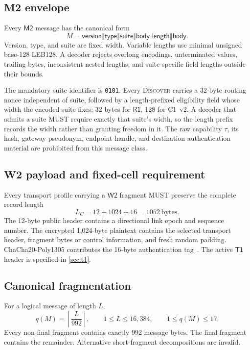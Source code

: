 \documentclass[11pt,oneside]{article}
\newcommand{\concat}{\mathbin\Vert}
\newcommand{\Rone}{\ensuremath{\mathsf{R1}}}
\newcommand{\Mtwo}{\ensuremath{\mathsf{M2}}}
\newcommand{\Wtwo}{\ensuremath{\mathsf{W2}}}
\newcommand{\Tone}{\ensuremath{\mathsf{T1}}}
\newcommand{\code}[1]{\texttt{#1}}
\begin{document}
\subsection{M2 envelope}

Every \Mtwo{} message has the canonical form
\begin{equation}
M=\mathsf{version}\concat\mathsf{type}\concat\mathsf{suite}
\concat\mathsf{body\_length}\concat\mathsf{body}.
\label{eq:m2}
\end{equation}
Version, type, and suite are fixed width. Variable lengths use minimal unsigned base-128 LEB128. A decoder rejects overlong encodings, unterminated values, trailing bytes, inconsistent nested lengths, and suite-specific field lengths outside their bounds.

The mandatory suite identifier is \code{0101}. Every \textsc{Discover} carries a 32-byte routing nonce independent of suite, followed by a length-prefixed eligibility field whose width the encoded suite fixes: 32 bytes for \Rone{}, 128 for C1~v2. A decoder that admits a suite MUST require exactly that suite's width, so the length prefix records the width rather than granting freedom in it. The raw capability $\tau$, its hash, gateway pseudonym, endpoint handle, and destination authentication material are prohibited from this message class.

\subsection{W2 payload and fixed-cell requirement}

Every transport profile carrying a \Wtwo{} fragment MUST preserve the complete record length
\begin{equation}
L_C=12+1024+16=1052\ \text{bytes}.
\end{equation}
The 12-byte public header contains a directional link epoch and sequence number. The encrypted 1,024-byte plaintext contains the selected transport header, fragment bytes or control information, and fresh random padding. ChaCha20-Poly1305 contributes the 16-byte authentication tag~\cite{chacha}. The active \Tone{} header is specified in \cref{sec:t1}.

\subsection{Canonical fragmentation}

For a logical message of length $L$,
\begin{equation}
q(M)=\left\lceil\frac{L}{992}\right\rceil,
\qquad 1\le L\le16{,}384,
\qquad 1\le q(M)\le17.
\label{eq:fragmentcount}
\end{equation}
Every non-final fragment contains exactly 992 message bytes. The final fragment contains the remainder. Alternative short-fragment decompositions are invalid.
\end{document}
